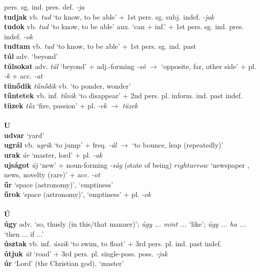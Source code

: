 \documentclass[11pt]{article}
\begin{document}
pers. sg. ind. pres. def. \emph{-ja} \\
\textbf{tudjak} vb. \emph{tud} `to know, to be able' + 1st
pers. sg. subj. indef. \emph{-jak} \\
\textbf{tudok} vb. \emph{tud} `to know, to be able' \textbar\textbar{} aux. `can +
inf.' + 1st pers. sg. ind. pres. indef. \emph{-ok} \\
\textbf{tudtam} vb. \emph{tud} `to know, to be able' + 1st
pers. sg. ind. past \\
\textbf{túl} adv. `beyond' \\
\textbf{túlsokat} adv. \emph{túl} `beyond' + adj.\hyp{}forming \emph{-só}
$\rightarrow$ `opposite, far, other side' + pl. \emph{-k} + acc. \emph{-at} \\
\textbf{tünődik} \emph{tűnődik} vb. `to ponder, wonder' \\
\textbf{tűntetek} vb. inf. \emph{tűnik} `to disappear' + 2nd
pers. pl. inform. ind. past indef. \\
\textbf{tüzek} \emph{tűz} `fire, passion' + pl. \emph{-ek}
$\rightarrow$ \emph{tüzek} \\
\ \\
\noindent \textbf{\large U} \\
\textbf{udvar} `yard' \\
\textbf{ugrál} vb. \emph{ugrik} `to jump' + freq. \emph{-ál}
$\rightarrow$ `to bounce, leap (repeatedly)' \\
\textbf{urak} \emph{úr} `master, lord' + pl. \emph{-ak} \\
\textbf{ujságot} \emph{új} `new' + noun\hyp{}forming \emph{-ság}
(state of being)
$rightarrow$ `newspaper , news, novelty (rare)' + acc. \emph{-ot} \\
\textbf{űr} `space (astronomy)', `emptiness' \\
\textbf{űrok} `space (astronomy)', `emptiness' + pl. \emph{-ok} \\
\ \\
\noindent \textbf{\large Ú} \\
\textbf{úgy} adv. `so, thusly (in this/that manner)'; \emph{úgy
... mint ...} `like'; \emph{úgy ... ha ...} `then ... if ...' \\
\textbf{úsztak} vb. inf. \emph{úszik} `to swim, to float' + 3rd
pers. pl. ind. past indef. \\
\textbf{útjuk} \emph{út} `road' + 3rd
pers. pl. single\hyp{}poss. poss. \emph{-juk} \\
\textbf{úr} `Lord' (the Christian god), `master' \\
\end{document}
